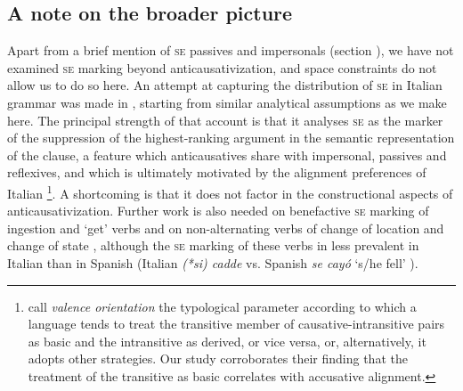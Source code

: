 \documentclass[output=paper,colorlinks,citecolor=brown
]{langscibook}
\begin{document}
\subsection{A note on the broader picture}
\label{bentley_section_5.5}

Apart from a brief mention of \textsc{se} passives and impersonals (section ), we have not examined \textsc{se} marking beyond anticausativization, and space constraints do not allow us to do so here. An attempt at capturing the distribution of \textsc{se} in Italian grammar was made in \citet{bentley2006split}, starting from similar analytical assumptions as we make here. The principal strength of that account is that it analyses \textsc{se} as the marker of the suppression of the highest-ranking argument in the semantic representation of the clause, a feature which anticausatives share with impersonal, passives and reflexives, and which is ultimately motivated by the alignment preferences of Italian \footnote{\citet{nichols2004transitivizing} call \textit{valence orientation} the typological parameter according to which a language tends to treat the transitive member of causative-intransitive pairs as basic and the intransitive as derived, or vice versa, or, alternatively, it adopts other strategies. Our study corroborates their finding that the treatment of the transitive as basic correlates with accusative alignment.}.  A shortcoming is that it does not factor in the constructional aspects of anticausativization. Further work is also needed on benefactive \textsc{se} marking of ingestion and ‘get’ verbs \citep[153—154]{bentley2006split} and on non-alternating verbs of change of location and change of state \citep{miguel2000operador,gonzales2006construcciones,jimenez2017causativity}, although the \textsc{se} marking of these verbs in less prevalent in Italian than in Spanish (Italian \textit{(*si) cadde} vs. Spanish \textit{se cayó} ‘s/he fell’ ). 
\end{document}
